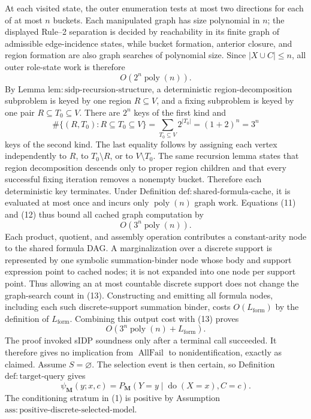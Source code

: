 At each visited state, the outer enumeration tests at most two directions for each of at most \(n\) buckets.  Each manipulated graph has size polynomial in \(n\); the displayed Rule--2 separation is decided by reachability in its finite graph of admissible edge-incidence states, while bucket formation, anterior closure, and region formation are also graph searches of polynomial size.  Since \(|X\cup C|\leq n\), all outer role-state work is therefore
\[
 O\!\left(2^n\operatorname{poly}(n)\right).
 \tag{11}
\]
By Lemma \(\mathrm{lem{:}sidp\text{-}recursion\text{-}structure}\), a deterministic region-decomposition subproblem is keyed by one region \(R\subseteq V\), and a fixing subproblem is keyed by one pair \(R\subseteq T_0\subseteq V\).  There are \(2^n\) keys of the first kind and
\[
 \#\{(R,T_0):R\subseteq T_0\subseteq V\}
 =\sum_{T_0\subseteq V}2^{|T_0|}
 =(1+2)^n=3^n
 \tag{12}
\]
keys of the second kind.  The last equality follows by assigning each vertex independently to \(R\), to \(T_0\setminus R\), or to \(V\setminus T_0\).  The same recursion lemma states that region decomposition descends only to proper region children and that every successful fixing iteration removes a nonempty bucket.  Therefore each deterministic key terminates.  Under Definition \(\mathrm{def{:}shared\text{-}formula\text{-}cache}\), it is evaluated at most once and incurs only \(\operatorname{poly}(n)\) graph work.  Equations (11) and (12) thus bound all cached graph computation by
\[
 O\!\left(3^n\operatorname{poly}(n)\right).
 \tag{13}
\]
Each product, quotient, and assembly operation contributes a constant-arity node to the shared formula DAG.  A marginalization over a discrete support is represented by one symbolic summation-binder node whose body and support expression point to cached nodes; it is not expanded into one node per support point.  Thus allowing an at most countable discrete support does not change the graph-search count in (13).  Constructing and emitting all formula nodes, including each such discrete-support summation binder, costs \(O(L_{\mathrm{form}})\) by the definition of \(L_{\mathrm{form}}\).  Combining this output cost with (13) proves
\[
 O\!\left(3^n\operatorname{poly}(n)+L_{\mathrm{form}}\right).
\]
The proof invoked sIDP soundness only after a terminal call succeeded.  It therefore gives no implication from \(\operatorname{AllFail}\) to nonidentification, exactly as claimed.
Assume \(S=\varnothing\).  The selection event is then certain, so Definition \(\mathrm{def{:}target\text{-}query}\) gives
\[
 \psi_{\mathbf M}(y;x,c)
 =P_{\mathbf M}(Y=y\mid\operatorname{do}(X=x),C=c).
 \tag{1}
\]
The conditioning stratum in (1) is positive by Assumption \(\mathrm{ass{:}positive\text{-}discrete\text{-}selected\text{-}model}\).

